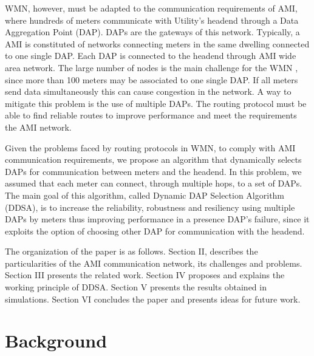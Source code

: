 \documentclass[conference]{IEEEtran}
\begin{document}
WMN, however, must be adapted to the communication requirements of AMI, where hundreds of meters communicate with Utility's headend through a Data Aggregation Point (DAP). DAPs are the gateways of this network. Typically, a AMI is constituted of networks connecting meters in the same dwelling connected to one single DAP. Each DAP is connected to the headend through AMI wide area network. The large number of nodes is the main challenge for the WMN \cite{Akyildiz2005}, since more than 100 meters may be associated to one single DAP.  If all meters  send data simultaneously this can cause congestion in the network. A way to mitigate this problem is the use of multiple DAPs. The routing protocol must be able to find reliable routes to improve performance and meet the requirements the AMI network.


Given the problems faced by routing protocols in WMN, to comply with AMI communication requirements, we propose an algorithm that dynamically selects DAPs for communication between meters and the headend. In this problem, we assumed that each meter can connect, through multiple hops, to a set of DAPs. The main goal of this algorithm, called Dynamic DAP Selection Algorithm (DDSA), is to increase the reliability, robustness and resiliency using multiple DAPs by meters thus improving performance in a presence DAP's failure, since it exploits the option of choosing other DAP for communication with the headend.

The organization of the paper is as follows. Section II, describes the particularities of the AMI communication network, its challenges and problems. Section III presents the related work. Section IV proposes and explains the working principle of DDSA. Section V presents the results obtained in simulations. Section VI concludes the paper and presents ideas for future work.



\section{Background}

\end{document}
